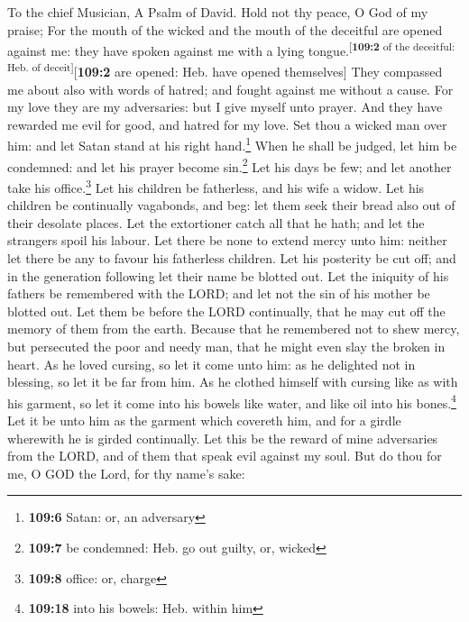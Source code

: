 To the chief Musician, A Psalm of David.  Hold not thy
peace, O God of my praise;  For the mouth of the wicked
and the mouth of the deceitful are opened against me: they have spoken
against me with a lying tongue.\textsuperscript{{[}\textbf{109:2} of the
deceitful: Heb. of deceit{]}}{[}\textbf{109:2} are opened: Heb. have
opened themselves{]}  They compassed me about also with
words of hatred; and fought against me without a cause. 
For my love they are my adversaries: but I give myself unto prayer.
 And they have rewarded me evil for good, and hatred for
my love.  Set thou a wicked man over him: and let Satan
stand at his right hand.\footnote{\textbf{109:6} Satan: or, an adversary}
 When he shall be judged, let him be condemned: and let
his prayer become sin.\footnote{\textbf{109:7} be condemned: Heb. go out
  guilty, or, wicked}  Let his days be few; and let
another take his office.\footnote{\textbf{109:8} office: or, charge}
 Let his children be fatherless, and his wife a widow.
 Let his children be continually vagabonds, and beg: let
them seek their bread also out of their desolate places. 
Let the extortioner catch all that he hath; and let the strangers spoil
his labour.  Let there be none to extend mercy unto him:
neither let there be any to favour his fatherless children.
 Let his posterity be cut off; and in the generation
following let their name be blotted out.  Let the
iniquity of his fathers be remembered with the LORD; and let not the sin
of his mother be blotted out.  Let them be before the
LORD continually, that he may cut off the memory of them from the earth.
 Because that he remembered not to shew mercy, but
persecuted the poor and needy man, that he might even slay the broken in
heart.  As he loved cursing, so let it come unto him: as
he delighted not in blessing, so let it be far from him. 
As he clothed himself with cursing like as with his garment, so let it
come into his bowels like water, and like oil into his bones.\footnote{\textbf{109:18}
  into his bowels: Heb. within him}  Let it be unto him
as the garment which covereth him, and for a girdle wherewith he is
girded continually.  Let this be the reward of mine
adversaries from the LORD, and of them that speak evil against my soul.
 But do thou for me, O GOD the Lord, for thy name's sake:

